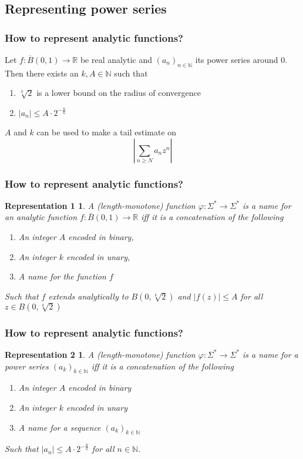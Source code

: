 \documentclass[xcolor=pdftex,dvipsnames,table]{beamer}
\newcommand{\N}{\ensuremath{\mathbb{N}}}
\newcommand{\R}{\ensuremath{\mathbb{R}}}
\newcommand{\abs}[1]{\left|#1\right|}
\newtheorem{representation1}{Representation 1}
\newtheorem{representation2}{Representation 2}
\begin{document}
\subsection*{Representing power series}
\begin{frame}
\frametitle{How to represent analytic functions?}
\begin{lemma}
  Let $f : \overline B(0,1) \to \R$ be real analytic and $(a_n)_{n \in \N}$ its power series around $0$.\\
  Then there exists an $k,A \in \N$ such that 
  \begin{enumerate}
  \item $\sqrt[k]{2}$ is a lower bound on the radius of convergence
  \item $\abs{a_n} \leq A \cdot 2^{-\frac{n}{k}}$
  \end{enumerate}
\end{lemma}
\pause
$A$ and $k$ can be used to make a tail estimate on
$$ \left | \sum_{n \geq N} a_n z^n \right |  $$
\end{frame}
\begin{frame}
\frametitle{How to represent analytic functions?}
\begin{representation1}
  A (length-monotone) function $\varphi: \Sigma^* \to \Sigma^*$ is a name for an analytic function $f:\bar B(0,1) \to \R$ iff it is a concatenation of the following  
  \begin{enumerate}
  \item An integer $A$ encoded in binary,
  \item An integer $k$ encoded in unary,
  \item A name for the function $f$
  \end{enumerate}
  Such that $f$ extends analytically to $B(0, \sqrt[k]{2})$ and $\abs{f(z)} \leq A$ for all $z \in B(0, \sqrt[k]{2})$
\end{representation1}
\end{frame}
\begin{frame}
\frametitle{How to represent analytic functions?}
\begin{representation2}
  A (length-monotone) function $\varphi: \Sigma^* \to \Sigma^*$ is a name for a power series $(a_k)_{k \in \N}$ iff it is a concatenation of the following
  \begin{enumerate}
  \item An integer $A$ encoded in binary
  \item An integer $k$ encoded in unary
  \item A name for a sequence $(a_k)_{k \in \N}$
  \end{enumerate}
  Such that $\abs{a_n} \leq A \cdot 2^{-\frac{n}{k}}$ for all $n \in \N$.
\end{representation2}
\end{frame}
\end{document}
